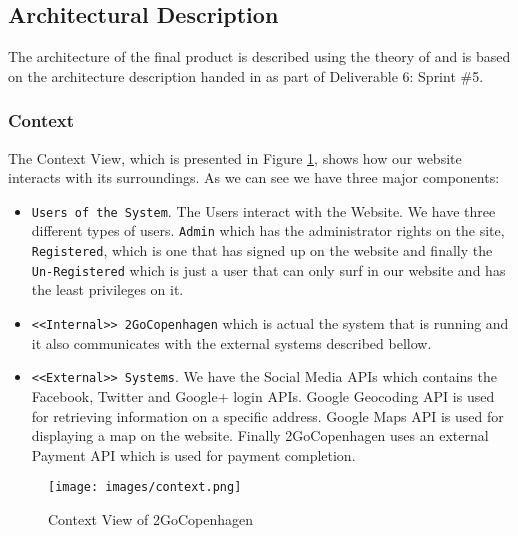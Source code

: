 \subsection{Architectural Description}

The architecture of the final product is described using the theory of \cite{Christensen} and is based on the architecture description handed in as part of Deliverable 6: Sprint \#5. 
\subsubsection{Context}
 The Context View, which is presented in Figure \ref{contextView}, shows how our website interacts with its surroundings.
 As we can see we have three major components:
 
\begin{itemize}
	\item \verb|Users of the System|. The Users interact with the Website. We have three different types of users. \verb|Admin| which has the administrator rights on the site, \verb|Registered|, which is one that has signed up on the website and finally the \verb|Un-Registered| which is just a user that can only surf in our website and has the least privileges on it.
	\item \verb|<<Internal>> 2GoCopenhagen| which is actual the system that is running and it also communicates with the external systems described bellow.
	\item \verb|<<External>> Systems|. We have the Social Media APIs which contains the Facebook, Twitter and Google+ login APIs. Google Geocoding API is used for retrieving information on a specific address. Google Maps API is used for displaying a map on the website. Finally 2GoCopenhagen uses an external Payment API which is used for payment completion.
\end{itemize}	 

\begin{figure}[H]
	\centering
	\texttt{[image: images/context.png]}
	\caption{Context View of 2GoCopenhagen}
	\label{contextView}
\end{figure}
\pagebreak




